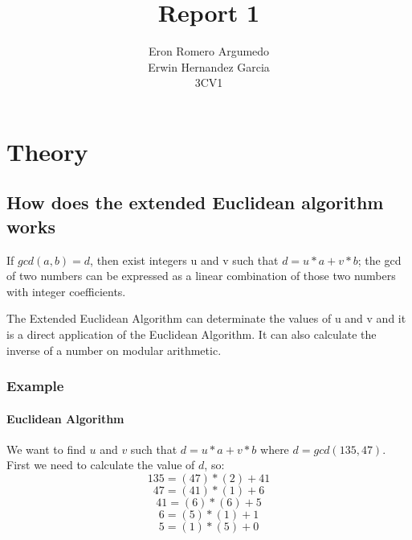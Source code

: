 \documentclass[titlepage, 12pt]{article}
\title{Report 1}
\author{Eron Romero Argumedo\\Erwin Hernandez Garcia\\3CV1}
\numberwithin{equation}{section}%
\numberwithin{figure}{section}%
\numberwithin{table}{section}%
\begin{document}
	\maketitle
	\tableofcontents
	\listoffigures
	\listoftables
	\newpage
	\section{Theory}
		\subsection{How does the extended Euclidean algorithm works}
		If $gcd(a,b)=d$, then exist integers u and v such that $d = u*a + v*b$; the gcd of two numbers can be expressed as a linear combination of those two numbers with integer coefficients. \bigskip
		
		The Extended Euclidean Algorithm can determinate the values of u and v and it is a direct application of the Euclidean Algorithm. It can also calculate the inverse of a number on modular arithmetic.\cite{ExtendedEuclidean} \bigskip
		
		\subsubsection{Example}
		\paragraph*{Euclidean Algorithm}
		We want to find $u$ and $v$ such that $d = u*a + v*b$ where $d=gcd(135, 47)$.
		First we need to calculate the value of $d$, so:
			\begin{equation}\label{FirstStepEuclidean}
			135 = (47)*(2) + 41
			\end{equation}
			\begin{equation}\label{SecondStepEuclidean}
			47 = (41)*(1) + 6
			\end{equation}
			\begin{equation}\label{ThirdStepEuclidean}
			41 = (6)*(6) + 5
			\end{equation}
			\begin{equation}\label{FourtStepEuclidean}
			6 = (5)*(1) + 1
			\end{equation}
			\begin{equation}\label{FifthStepEuclidean}
			5 = (1)*(5) + 0
			\end{equation}
\end{document}
